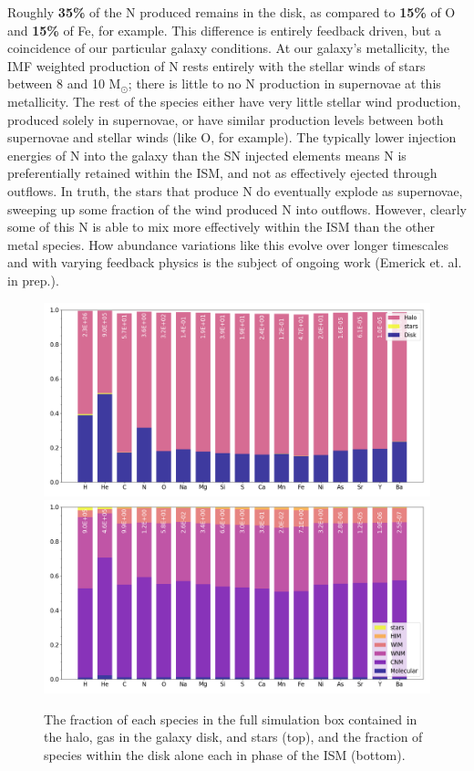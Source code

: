 \documentclass[twocolumn]{aastex61}
\begin{document}
Roughly \textbf{35\%} of the N produced remains in the disk, as compared to \textbf{15\%} of O and \textbf{15\%} of Fe, for example. This difference is entirely feedback driven, but a coincidence of our particular galaxy conditions. At our galaxy's metallicity, the IMF weighted production of N rests entirely with the stellar winds of stars between 8 and 10 M$_{\odot}$; there is little to no N production in supernovae at this metallicity. The rest of the species either have very little stellar wind production, produced solely in supernovae, or have similar production levels between both supernovae and stellar winds (like O, for example). The typically lower injection energies of N into the galaxy than the SN injected elements means N is preferentially retained within the ISM, and not as effectively ejected through outflows. In truth, the stars that produce N do eventually explode as supernovae, sweeping up some fraction of the wind produced N into outflows. However, clearly some of this N is able to mix more effectively within the ISM than the other metal species. How abundance variations like this evolve over longer timescales and with varying feedback physics is the subject of ongoing work (Emerick et. al. in prep.). 

\begin{figure}
\includegraphics[width=0.9\linewidth]{species_bar.png}\\
\includegraphics[width=0.9\linewidth]{species_bar_disk.png}
\caption{The fraction of each species in the full simulation box contained in the halo, gas in the galaxy disk, and stars (top), and the fraction of species within the disk alone each in phase of the ISM (bottom).}
\label{fig:species_fractions}
\end{figure}
\end{document}
